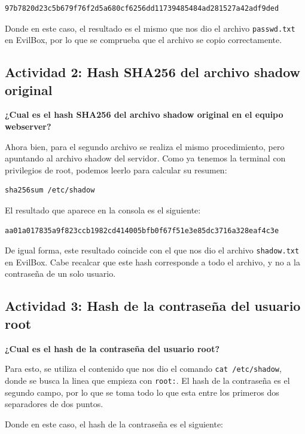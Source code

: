 \documentclass[letterpaper,11pt]{article}
\begin{document}
\begin{lstlisting}[style=hashCredencial]
97b7820d23c5b679f76f2d5a680cf6256dd11739485484ad281527a42adf9ded
\end{lstlisting}

Donde en este caso, el resultado es el mismo que nos dio el
archivo \texttt{passwd.txt} en EvilBox, por lo que se comprueba
que el archivo se copio correctamente.

\subsection{Actividad 2: Hash SHA256 del archivo shadow original}

\textbf{¿Cual es el hash SHA256 del archivo shadow original en
el equipo webserver?}

Ahora bien, para el segundo archivo se realiza el mismo
procedimiento, pero apuntando al archivo shadow del servidor.
Como ya tenemos la terminal con privilegios de root, podemos
leerlo para calcular su resumen:

\begin{lstlisting}[style=consolaSeguridad]
sha256sum /etc/shadow
\end{lstlisting}

El resultado que aparece en la consola es el siguiente:

\begin{lstlisting}[style=hashCredencial]
aa01a017835a9f823ccb1982cd414005bfb0f67f51e3e85dc3716a328eaf4c3e
\end{lstlisting}

De igual forma, este resultado coincide con el que nos dio el
archivo \texttt{shadow.txt} en EvilBox. Cabe recalcar que este
hash corresponde a todo el archivo, y no a la contraseña de un
solo usuario.

\subsection{Actividad 3: Hash de la contraseña del usuario root}

\textbf{¿Cual es el hash de la contraseña del usuario root?}

Para esto, se utiliza el contenido que nos dio el comando
\texttt{cat /etc/shadow}, donde se busca la linea que empieza
con \texttt{root:}. El hash de la contraseña es el segundo
campo, por lo que se toma todo lo que esta entre los primeros
dos separadores de dos puntos.

Donde en este caso, el hash de la contraseña es el siguiente:
\end{document}

